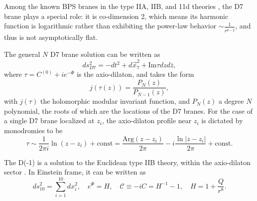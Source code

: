 {\color{orange}
Among the known BPS branes in the type IIA, IIB, and 11d theories \cite{Stelle:1998xg}, the D7 brane plays a special role: it is co-dimension 2, which means its harmonic function is logarithmic rather than exhibiting the power-law behavior $\sim \frac{1}{r^{\tilde{d}-2}}$, and thus is not asymptotically flat.

The general $N$ D7 brane solution can be written as \cite{Greene:1989ya,Gibbons:1995vg,Tseytlin:1996ne,Bergshoeff:2006jj}
\begin{equation}
ds_{D7}^2 = -dt^2 + d\vec{x}_7^2 + \text{Im} \tau dz d\bar z,
\end{equation}
where $\tau = C^{(0)} + i e^{-\Phi}$ is the axio-dilaton, and takes the form
\begin{equation}
j(\tau(z)) = \frac{P_N(z)}{P_{N-1}(z)},
\end{equation}
with $j(\tau)$ the holomorphic modular invariant function, and $P_N(z)$ a degree $N$ polynomial, the roots of which are the locations of the D7 branes.
For the case of a single D7 brane localized at $z_i$, the axio-dilaton profile near $z_i$ is dictated by monodromies to be
\begin{equation}
\tau \sim \frac{1}{2\pi i}\ln (z-z_i)+\text{const}
 = \frac{\text{Arg}(z-z_i)}{2\pi} -i\frac{\ln |z-z_i|}{2\pi}+\text{const}.
 \label{D7 axio-dilaton profile}
\end{equation}


}

{\color{orange}
The D(-1) is a solution to the Euclidean type IIB theory, within the axio-dilaton sector \cite{Gibbons:1995vg}.
In Einstein frame, it can be written as
\begin{equation}
ds_{10}^2 = \sum_{i=1}^{10} dx_i^2,\quad
e^\Phi = H, \quad\mathcal C\equiv-iC = H^{-1}-1,\quad
H=1+\frac{Q}{r^8}.
\end{equation}
}

